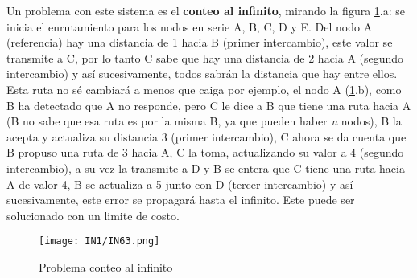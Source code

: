 \documentclass[
	12pt, %
	fleqn, %
	a4paper, %
	oneside, %
]{LegrandOrangeBook}
\begin{document}
Un problema con este sistema es el \textbf{conteo al infinito}, mirando la figura \ref{fig:cont inf}.a: se inicia el enrutamiento para los nodos en serie A, B, C, D y E. Del nodo A (referencia) hay una distancia de 1 hacia B (primer intercambio), este valor se transmite a C, por lo tanto C sabe que hay una distancia de 2 hacia A (segundo intercambio) y así sucesivamente, todos sabrán la distancia que hay entre ellos. Esta ruta no sé cambiará a menos que caiga por ejemplo, el nodo A (\ref{fig:cont inf}.b), como B ha detectado que A no responde, pero C le dice a B que tiene una ruta hacia A (B no sabe que esa ruta es por la misma B, ya que pueden haber \textit{n} nodos), B la acepta y actualiza su distancia 3 (primer intercambio), C ahora se da cuenta que B propuso una ruta de 3 hacia A, C la toma, actualizando su valor a 4 (segundo intercambio), a su vez la transmite a D y B se entera que C tiene una ruta hacia A de valor 4, B se actualiza a 5 junto con D (tercer intercambio) y así sucesivamente, este error se propagará hasta el infinito. Este puede ser solucionado con un limite de costo.
\begin{figure}[]
\centering
\texttt{[image: IN1/IN63.png]}
\caption{Problema conteo al infinito}
\label{fig:cont inf}
\end{figure}
\end{document}
